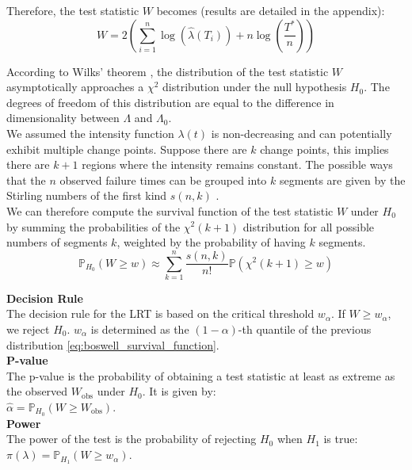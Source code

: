\documentclass{journalstyle}
\begin{document}
Therefore, the test statistic $W$ becomes (results are detailed in the appendix):
\begin{equation}
    W = 2 \left( \sum_{i=1}^{n} \log(\hat{\lambda}(T_i)) + n \log\left(\frac{T^*}{n}\right) \right)
    \label{eq:boswell_test_statistic}
\end{equation}

According to Wilks' theorem \cite{Wilks1938}, the distribution of the test statistic $W$ asymptotically approaches a $\chi^2$ distribution under the null hypothesis $H_0$.
The degrees of freedom of this distribution are equal to the difference in dimensionality between $\Lambda$ and $\Lambda_0$. \\

We assumed the intensity function $\lambda(t)$ is non-decreasing and can potentially exhibit multiple change points.
Suppose there are $k$ change points, this implies there are $k + 1$ regions where the intensity remains constant.
The possible ways that the $n$ observed failure times can be grouped into $k$ segments are given by the Stirling numbers of the first kind $s(n, k)$ \cite{StirlingNumbers}. \\
We can therefore compute the survival function of the test statistic $W$ under $H_0$ by summing the probabilities of the $\chi^2(k+1)$ distribution for all possible numbers of segments $k$, weighted by the probability of having $k$ segments.
\begin{equation}
    \mathbb{P}_{H_0}(W \geq w) \approx \sum_{k=1}^{n} \frac{s(n, k)}{n!} \mathbb{P}(\chi^2(k+1) \geq w)
    \label{eq:boswell_survival_function}
\end{equation}


\noindent\textbf{Decision Rule} \\
The decision rule for the LRT is based on the critical threshold $w_{\alpha}$. 
If $W \geq w_{\alpha}$, we reject $H_0$. $w_{\alpha}$ is determined as the $(1 - \alpha)$-th quantile of the previous distribution \eqref{eq:boswell_survival_function}. \\

\noindent\textbf{P-value} \\
The p-value is the probability of obtaining a test statistic at least as extreme as the observed $W_{\text{obs}}$ under $H_0$. 
It is given by: \\
$\hat{\alpha} = \mathbb{P}_{H_0}(W \geq W_{\text{obs}})$. \\

\noindent\textbf{Power} \\
The power of the test is the probability of rejecting $H_0$ when $H_1$ is true: \\
$\pi(\lambda) = \mathbb{P}_{H_1}(W \geq w_{\alpha})$. \\
\end{document}
